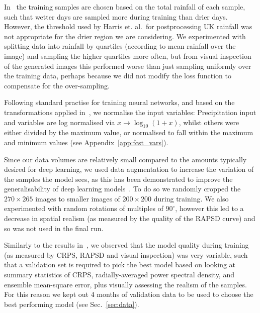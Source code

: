 \documentclass{article}
\begin{document}
In~\cite{harris_generative_2022} the training samples are chosen based on the total rainfall of each sample, such that wetter days are sampled more during training than drier days. However, the threshold used by Harris et. al.~for postprocessing UK rainfall was not appropriate for the drier region we are considering. We experimented with splitting data into rainfall by quartiles (according to mean rainfall over the image) and sampling the higher quartiles more often, but from visual inspection of the generated images this performed worse than just sampling uniformly over the training data, perhaps because we did not modify the loss function to compensate for the over-sampling.

Following standard practise for training neural networks, and based on the transformations applied in~\cite{harris_generative_2022}, we normalise the input variables: Precipitation input and variables are log normalised via $x \to \log_{10}(1 + x)$, whilst others were either divided by the maximum value, or normalised to fall within the maximum and minimum values (see Appendix~\ref{app:fcst_vars}).


Since our data volumes are relatively small compared to the amounts typically desired for deep learning, we used data augmentation to increase the variation of the samples the model sees, as this has been demonstrated to improve the generalisability of deep learning models~\citep{goodfellow_deep_2016}. To do so we randomly cropped the $270 \times 265$ images to smaller images of $200 \times 200$ during training. We also experimented with random rotations of multiples of $90^{\circ}$, however this led to a decrease in spatial realism (as measured by the quality of the RAPSD curve) and so was not used in the final run.



Similarly to the results in~\cite{harris_generative_2022}, we observed that the model quality during training (as measured by CRPS, RAPSD and visual inspection) was very variable, such that a validation set is required to pick the best model based on looking at summary statistics of CRPS, radially-averaged power spectral density, and ensemble mean-square error, plus visually assessing the realism of the samples. For this reason we kept out 4 months of validation data to be used to choose the best performing model (see Sec.~\ref{sec:data}).
\end{document}
